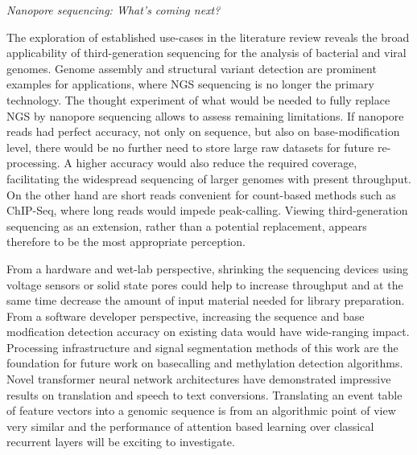 \textit{Nanopore sequencing: What's coming next?}

The exploration of established use-cases in the literature review reveals the broad applicability of third-generation sequencing for the analysis of bacterial and viral genomes.
Genome assembly and structural variant detection are prominent examples for applications, where NGS sequencing is no longer the primary technology.
The thought experiment of what would be needed to fully replace NGS by nanopore sequencing allows to assess remaining limitations.
If nanopore reads had perfect accuracy, not only on sequence, but also on base-modification level, there would be no further need to store large raw datasets for future re-processing.
A higher accuracy would also reduce the required coverage, facilitating the widespread sequencing of larger genomes with present throughput.
On the other hand are short reads convenient for count-based methods such as ChIP-Seq, where long reads would impede peak-calling.
Viewing third-generation sequencing as an extension, rather than a potential replacement, appears therefore to be the most appropriate perception.

From a hardware and wet-lab perspective, shrinking the sequencing devices using voltage sensors or solid state pores could help to increase throughput and at the same time decrease the amount of input material needed for library preparation.
From a software developer perspective, increasing the sequence and base modfication detection accuracy on existing data would have wide-ranging impact.
Processing infrastructure and signal segmentation methods of this work are the foundation for future work on basecalling and methylation detection algorithms.
Novel transformer neural network architectures have demonstrated impressive results on translation and speech to text conversions.
Translating an event table of feature vectors into a genomic sequence is from an algorithmic point of view very similar and the performance of attention based learning over classical recurrent layers will be exciting to investigate.







